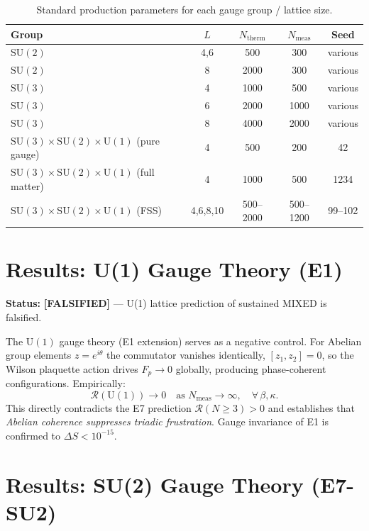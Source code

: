 \documentclass[12pt,a4paper]{article}
\newcommand{\R}{\mathcal{R}}           %
\newcommand{\SU}[1]{\mathrm{SU}(#1)}
\newcommand{\UN}[1]{\mathrm{U}(#1)}
\newcommand{\SM}{\SU{3}\!\times\!\SU{2}\!\times\!\UN{1}}
\newcommand{\falsified}{\textcolor{red!70!black}{\textbf{[FALSIFIED]}}}
\theoremstyle{plain}
\theoremstyle{definition}
\theoremstyle{remark}
\begin{document}
\begin{table}[ht]
\centering
\caption{Standard production parameters for each gauge group / lattice size.}
\label{tab:run_params}
\begin{tabular}{lcccc}
\toprule
Group & $L$ & $N_\text{therm}$ & $N_\text{meas}$ & Seed \\
\midrule
$\SU{2}$            & 4,6   & 500  & 300  & various \\
$\SU{2}$            & 8     & 2000 & 300  & various \\
$\SU{3}$            & 4     & 1000 & 500  & various \\
$\SU{3}$            & 6     & 2000 & 1000 & various \\
$\SU{3}$            & 8     & 4000 & 2000 & various \\
$\SM$ (pure gauge)  & 4     & 500  & 200  & 42     \\
$\SM$ (full matter) & 4     & 1000 & 500  & 1234   \\
$\SM$ (FSS)         & 4,6,8,10 & 500--2000 & 500--1200 & 99--102 \\
\bottomrule
\end{tabular}
\end{table}

\section{Results: U(1) Gauge Theory (E1)}
\label{sec:u1}

\begin{statusbox}
\textbf{Status:} \falsified{} --- U(1) lattice prediction of sustained MIXED is falsified.
\end{statusbox}

The $\UN{1}$ gauge theory (E1 extension) serves as a negative control.
For Abelian group elements $z=e^{i\theta}$ the commutator vanishes identically,
$[z_1,z_2]=0$, so the Wilson plaquette action drives $F_p\to 0$ globally, producing
phase-coherent configurations.
Empirically:
\[
  \R(\UN{1}) \to 0 \quad \text{as } N_\text{meas}\to\infty,\quad
  \forall\,\beta,\kappa.
\]
This directly contradicts the E7 prediction $\R(N\geq 3)>0$ and establishes that
\emph{Abelian coherence suppresses triadic frustration}.
Gauge invariance of E1 is confirmed to $\Delta S<10^{-15}$.

\section{Results: SU(2) Gauge Theory (E7-SU2)}
\label{sec:su2}
\end{document}
